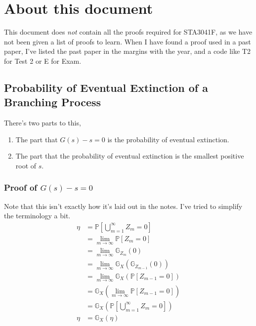 \documentclass[12pt]{report}
\begin{document}
\maketitle
\tableofcontents
\section{About this document}
This document does \textit{not} contain all the proofs required for STA3041F,
as we have not been given a list of proofs to learn. When I have found a proof
used in a past paper, I've listed the past paper in the margins with the year,
and a code like T2 for Test 2 or E for Exam.
\subsection{Probability of Eventual Extinction of a Branching Process}
There's two parts to this, 
\begin{enumerate}
    \item The part that $G(s) - s = 0$ is the probability of eventual
        extinction.
    \item The part that the probability of eventual extinction is the smallest
        positive root of $s$.
\end{enumerate}
\subsubsection{Proof of $G(s) - s = 0$}
Note that this isn't exactly how it's laid out in the notes. I've tried to
simplify the terminology a bit.
\begin{equation*}
    \begin{aligned}
        \eta &= \mathbb{P}\left[\bigcup_{m=1}^{\infty} Z_{m} = 0\right] \\
            &= \lim_{m\to\infty} \mathbb{P}\left[Z_{m} = 0\right] \\
            &= \lim_{m\to\infty} \mathbb{G}_{Z_{m}}(0) \\
            &= \lim_{m\to\infty} \mathbb{G}_{X}( \mathbb{G}_{Z_{m-1}}(0)) \\
            &= \lim_{m\to\infty} \mathbb{G}_{X}(\mathbb{P}\left[Z_{m-1} = 0\right]) \\
            &=  \mathbb{G}_{X}(\lim_{m\to\infty} \mathbb{P}\left[Z_{m-1} = 0\right])\\
            &=  \mathbb{G}_{X}\left(\mathbb{P}\left[\bigcup_{m=1}^{\infty}
            Z_{m} = 0\right]\right)\\
            \eta &=  \mathbb{G}_{X}(\eta)\\
    \end{aligned}
\end{equation*}
\end{document}
